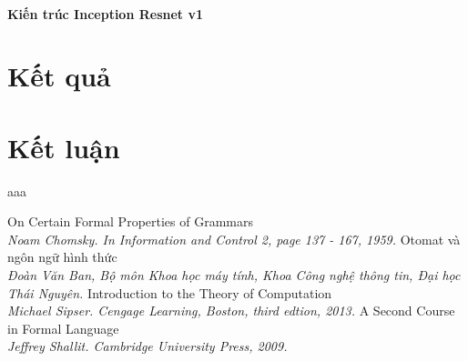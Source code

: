 \documentclass[12pt]{extreport}
\begin{document}
\subsubsection{Kiến trúc Inception Resnet v1}




\chapter{Kết quả}
\newpage
\chapter{Kết luận}
aaa

\newpage
\begin{thebibliography}{12}
	On Certain Formal Properties of Grammars\\
	\textit{Noam Chomsky. In Information and Control 2, page 137 - 167, 1959.}
	 Otomat và ngôn ngữ hình thức\\
	\textit{Đoàn Văn Ban, Bộ môn Khoa học máy tính, Khoa Công nghệ thông tin, Đại học Thái Nguyên.}
	Introduction to the Theory of Computation\\
	\textit{Michael Sipser. Cengage Learning, Boston, third edtion, 2013.
	}
	A Second Course in Formal Language\\
	\textit{Jeffrey Shallit. Cambridge University Press, 2009.}
	
	
	
\end{thebibliography}
\end{document}
